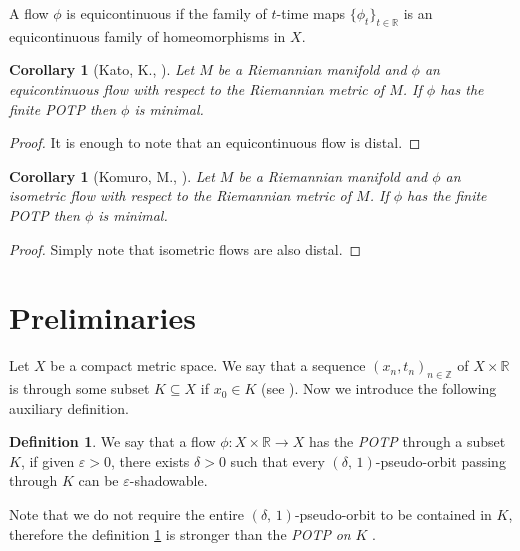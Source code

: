 \documentclass{amsart}
\newtheorem{corollary}[theorem]{Corollary}
\theoremstyle{definition}
\newtheorem{definition}[theorem]{Definition}
\newcommand{\ep}{\varepsilon}
\begin{document}
A flow $\phi$ is equicontinuous if the family of $t$-time maps $\{\phi_{t}\}_{t\in\mathbb{R}}$ is an equicontinuous family of homeomorphisms in $X$.

\begin{corollary}[Kato, K., \cite{Kato84}]
	Let $M$ be a Riemannian manifold and $\phi$ an equicontinuous flow with respect to the Riemannian metric of $M$. If $\phi$  has the finite POTP then $\phi$ is minimal.
\end{corollary}

\begin{proof}
It is enough to note that an equicontinuous flow is distal.
\end{proof}


\begin{corollary}[Komuro, M., \cite{Komuro84}]
	Let $M$ be a Riemannian manifold and $\phi$ an isometric flow with respect to the Riemannian metric of $M$. If $\phi$  has the finite POTP then $\phi$ is minimal.
\end{corollary}

\begin{proof}
Simply note that isometric flows are also distal.
\end{proof}




\section{Preliminaries} 

Let $X$ be a compact metric space. We say that a sequence $(x_n,t_n)_{n\in \mathbb{Z}}$ of $X\times\mathbb{R}$ is through some subset $K\subseteq X$  if $x_0\in K$ (see \cite{Morales16}). Now we introduce the following auxiliary definition.

\begin{definition}\label{defi5}
We say that a flow $\phi\colon X\times\mathbb{R}\to X$ has the {\em POTP} through a subset $K$, if given $\ep > 0$, there exists $\delta > 0$ such that every  $(\delta,\, 1)$-pseudo-orbit passing through $K$ can be $\ep$-shadowable.
\end{definition}

Note that we do not require the entire $(\delta,\, 1)$-pseudo-orbit to be contained in $K$, therefore the definition \ref{defi5} is stronger than the {\em POTP} \emph{on} $K$ \cite{Pilyugin2008}. 
\end{document}
